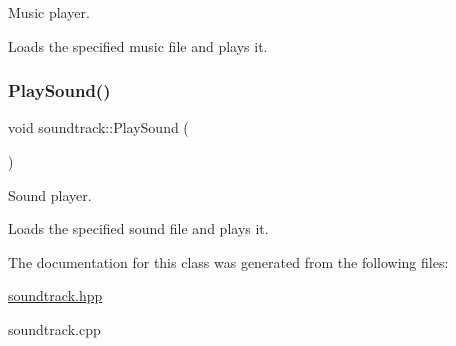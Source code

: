 Music player. 

Loads the specified music file and plays it. \mbox{\label{classsoundtrack_a3c86452d68b41eea981d0df4984713e8}} 
\subsubsection{\texorpdfstring{Play\+Sound()}{PlaySound()}}
{\footnotesize\ttfamily void soundtrack\+::\+Play\+Sound (\begin{DoxyParamCaption}{ }\end{DoxyParamCaption})}



Sound player. 

Loads the specified sound file and plays it. 

The documentation for this class was generated from the following files\+:\begin{DoxyCompactItemize}
\item 
\hyperlink{soundtrack_8hpp}{soundtrack.\+hpp}\item 
soundtrack.\+cpp\end{DoxyCompactItemize}
